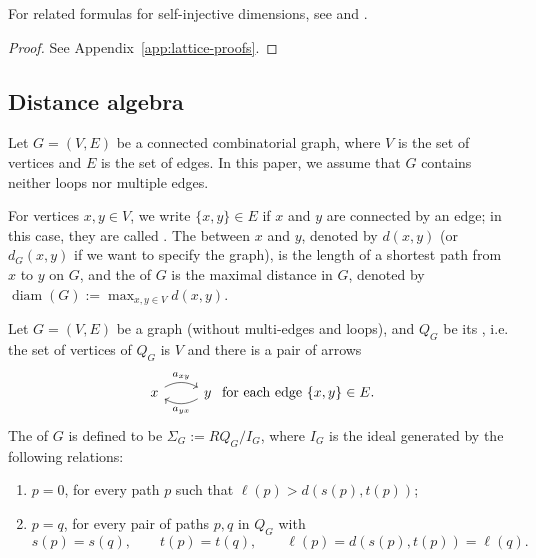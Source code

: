 \documentclass[a4paper,leqno]{amsart}
\begin{document}
\begin{rmk}
For related formulas for self-injective dimensions, see \cite[Proposition~1.1(3)]{GN01} and \cite[Lemma~4.17]{IKWY15}.
\end{rmk}

\begin{proof}
See Appendix~\ref{app:lattice-proofs}.
\end{proof}




\subsection{Distance algebra}

Let $G=(V,E)$ be a connected combinatorial graph, where $V$ is the set of vertices and $E$ is the set of edges. In this paper, we assume that $G$ contains neither loops nor multiple edges.

For vertices $x,y\in V$, we write $\{x,y\}\in E$ if $x$ and $y$ are connected by an edge; in this case, they are called . The  between $x$ and $y$, denoted by $d(x,y)$ (or $d_G(x,y)$ if we want to specify the graph), is the length of a shortest path from $x$ to $y$ on $G$, and the  of $G$ is the maximal distance in $G$, denoted by $\operatorname{diam}(G):=\max_{x,y\in V}d(x,y)$.

\begin{dfn}
Let $G=(V,E)$ be a graph (without multi-edges and loops), and $Q_G$ be its , i.e. the set of vertices of $Q_G$ is $V$ and there is a pair of arrows
\[\begin{tikzcd}
	x \arrow[r, "{a_{xy}}", bend left] & y \arrow[l, "{a_{yx}}", bend left]
\end{tikzcd} \text{ for each edge }\{x,y\}\in E.\]
The  of $G$ is defined to be $\Sigma_G:=R Q_G/I_G$, where $I_G$ is the ideal generated by the following relations:
\begin{enumerate}
\item $p=0$, for every path $p$ such that $\ell(p)>d(s(p),t(p))$;
\item $p=q$, for every pair of paths $p,q$ in $Q_G$ with
$$s(p)=s(q),\qquad t(p)=t(q),\qquad
\ell(p)=d(s(p),t(p))=\ell(q).$$
\end{enumerate}
\end{dfn}
\end{document}
